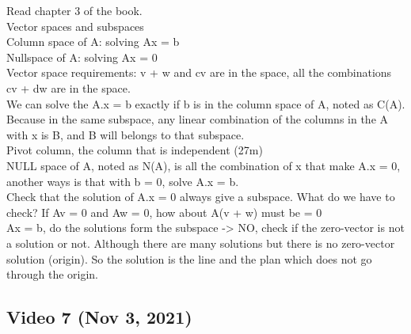 \documentclass{article}
\begin{document}
Read chapter 3 of the book.
\\Vector spaces and subspaces
\\Column space of A: solving Ax = b
\\Nullspace of A: solving Ax = 0
\\Vector space requirements: v + w and cv are in the space, all the combinations cv + dw are in the space.
\\We can solve the A.x = b exactly if b is in the column space of A, noted as C(A). Because in the same subspace, any linear combination of the columns in the A with x is B, and B will belongs to that subspace.
\\Pivot column, the column that is independent (27m)
\\NULL space of A, noted as N(A), is all the combination of x that make A.x = 0, another ways is that with b = 0, solve A.x = b.
\\Check that the solution of A.x = 0 always give a subspace. What do we have to check?
If Av = 0 and Aw = 0, how about A(v + w) must be = 0
\\Ax = b, do the solutions form the subspace -> NO, check if the zero-vector is not a solution or not. Although there are many solutions but there is no zero-vector solution (origin). So the solution is the line and the plan which does not go through the origin.

\subsection{Video 7 (Nov 3, 2021)}
\end{document}
